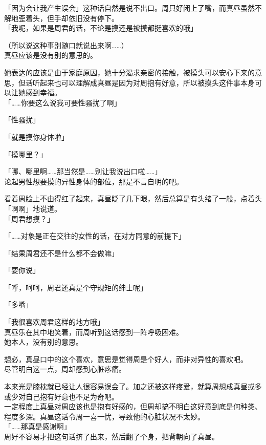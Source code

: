 「因为会让我产生误会」这种话自然是说不出口。周只好闭上了嘴，而真昼虽然不解地歪着头，但手却依旧没有停下。\\

「我呢，如果是周君的话，不论是摸还是被摸都挺喜欢的哦」

（所以说这种事别随口就说出来啊……）\\

真昼应该是没有别的意思的。

她表达的应该是由于家庭原因，她十分渴求亲密的接触，被摸头可以安心下来的意思，但话听起来也可以理解成真昼是因为对周抱有好意，所以被摸头这件事本身可以让她感到幸福。\\

「……你要这么说我可要性骚扰了啊」

「性骚扰」

「就是摸你身体啦」

「摸哪里？」

「哪、哪里啊……那当然是……别让我说出口啦……」\\

论起男性想要摸的异性身体的部位，那是不言自明的吧。

看着周脸上不由得红了起来，真昼眨了几下眼，然后总算是有头绪了一般，点着头「啊啊」地说道。\\

「周君想摸？」

「……对象是正在交往的女性的话，在对方同意的前提下」

「结果周君还不是什么都不会做嘛」

「要你说」

「呼，呵呵，周君还真是个守规矩的绅士呢」

「多嘴」

「我很喜欢周君这样的地方哦」\\

真昼乐在其中地笑着，而周听到这话感到一阵呼吸困难。\\

她本人，没有别的意思。

想必，真昼口中的这个喜欢，意思是觉得周是个好人，而非对异性的喜欢吧。\\

尽管明白这一点，周却感到心脏疼痛。

本来光是膝枕就已经让人很容易误会了。加之还被这样疼爱，就算周想成真昼或多或少对自己抱有好意也不足为奇吧。\\

一定程度上真昼对周应该也是抱有好感的，但周却搞不明白这好意到底是何种类、程度多深。真昼这话令周一喜一忧，导致他的心脏状况不太妙。\\

「……那真是感谢啊」\\

周好不容易才把这句话挤了出来，然后翻了个身，把背朝向了真昼。
